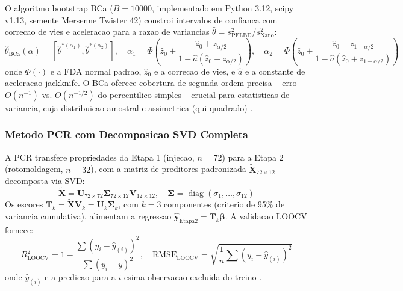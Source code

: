 \documentclass[11pt,a4paper,oneside]{article}
\begin{document}
O algoritmo bootstrap BCa ($B{=}10000$, implementado em Python 3.12, scipy v1.13, semente
Mersenne Twister 42) constroi intervalos de confianca com correcao de vies e aceleracao para a
razao de variancias $\hat{\theta}{=}s^2_{\text{PELBD}}/s^2_{\text{Nano}}$:
\begin{equation}
\hat{\theta}_{\text{BCa}}(\alpha) = [\hat{\theta}^{*(\alpha_1)}, \hat{\theta}^{*(\alpha_2)}],\quad
\alpha_1{=}\Phi\!\left(\hat{z}_0{+}\frac{\hat{z}_0{+}z_{\alpha/2}}{1{-}\hat{a}(\hat{z}_0{+}z_{\alpha/2})}\right),\quad \alpha_2{=}\Phi\!\left(\hat{z}_0{+}\frac{\hat{z}_0{+}z_{1-\alpha/2}}{1{-}\hat{a}(\hat{z}_0{+}z_{1-\alpha/2})}\right)
\label{eq:bca}
\end{equation}
onde $\Phi(\cdot)$ e a FDA normal padrao, $\hat{z}_0$ e a correcao de vies, e $\hat{a}$ e a
constante de aceleracao jackknife. O BCa oferece cobertura de segunda ordem precisa -- erro
$O(n^{-1})$ vs. $O(n^{-1/2})$ do percentilico simples -- crucial para estatisticas de variancia,
cuja distribuicao amostral e assimetrica (qui-quadrado) \cite{Cohen1988}.

\subsubsection{Metodo PCR com Decomposicao SVD Completa}

A PCR transfere propriedades da Etapa 1 (injecao, $n{=}72$) para a Etapa 2 (rotomoldagem,
$n{=}32$), com a matriz de preditores padronizada $\tilde{\mathbf{X}}_{72\times 12}$ decomposta via SVD:
\begin{equation}
\tilde{\mathbf{X}} = \mathbf{U}_{72\times 72}\boldsymbol{\Sigma}_{72\times 12}\mathbf{V}^\top_{12\times 12},\quad \boldsymbol{\Sigma}{=}\operatorname{diag}(\sigma_1,\dots,\sigma_{12})
\label{eq:svd}
\end{equation}
Os escores $\mathbf{T}_k{=}\tilde{\mathbf{X}}\mathbf{V}_k{=}\mathbf{U}_k\boldsymbol{\Sigma}_k$,
com $k{=}3$ componentes (criterio de 95\% de variancia cumulativa), alimentam a regressao
$\hat{\mathbf{y}}_{\text{Etapa2}} = \mathbf{T}_k\boldsymbol{\beta}$. A validacao LOOCV fornece:
\begin{equation}
R^2_{\text{LOOCV}} = 1 - \frac{\sum (y_i - \hat{y}_{(i)})^2}{\sum (y_i - \bar{y})^2},\quad \text{RMSE}_{\text{LOOCV}} = \sqrt{\frac{1}{n}\sum (y_i - \hat{y}_{(i)})^2}
\label{eq:loocv}
\end{equation}
onde $\hat{y}_{(i)}$ e a predicao para a $i$-esima observacao excluida do treino \cite{Montgomery2020}.
\end{document}
